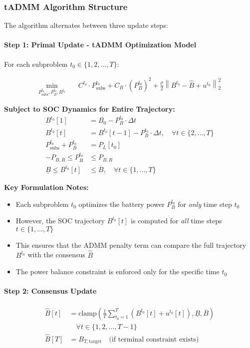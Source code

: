 \subsubsection{tADMM Algorithm Structure}

The algorithm alternates between three update steps:

\paragraph{Step 1: Primal Update - tADMM Optimization Model}
For each subproblem $t_0 \in \{1, 2, \ldots, T\}$:

\begin{align}
\min_{P_{\text{subs}}^{t_0}, P_{B}^{t_0}, B^{t_0}} \quad & C^{t_0} \cdot P_{\text{subs}}^{t_0} + C_B \cdot \left(P_{B}^{t_0}\right)^2 + \frac{\rho}{2} \left\| B^{t_0} - \hat{B} + u^{t_0} \right\|_2^2
\end{align}

\textbf{Subject to SOC Dynamics for Entire Trajectory:}
\begin{align}
B^{t_0}[1] &= B_0 - P_{B}^{t_0} \cdot \Delta t \\
B^{t_0}[t] &= B^{t_0}[t-1] - P_{B}^{t_0} \cdot \Delta t, \quad \forall t \in \{2, \ldots, T\} \\
P_{\text{subs}}^{t_0} + P_{B}^{t_0} &= P_L[t_0] \\
-P_{B,R} \leq P_{B}^{t_0} &\leq P_{B,R} \\
\underline{B} \leq B^{t_0}[t] &\leq \overline{B}, \quad \forall t \in \{1, \ldots, T\}
\end{align}

\textbf{Key Formulation Notes:}
\begin{itemize}
    \item Each subproblem $t_0$ optimizes the battery power $P_{B}^{t_0}$ for \textit{only} time step $t_0$
    \item However, the SOC trajectory $B^{t_0}[t]$ is computed for \textit{all} time steps $t \in \{1, \ldots, T\}$
    \item This ensures that the ADMM penalty term can compare the full trajectory $B^{t_0}$ with the consensus $\hat{B}$
    \item The power balance constraint is enforced only for the specific time $t_0$
\end{itemize}

\paragraph{Step 2: Consensus Update}
\begin{align}
\hat{B}[t] &= \text{clamp}\left( \frac{1}{T} \sum_{t_0=1}^{T} \left( B^{t_0}[t] + u^{t_0}[t] \right), \underline{B}, \overline{B} \right) \\
&\quad \forall t \in \{1, 2, \ldots, T-1\} \\
\hat{B}[T] &= B_{T,\text{target}} \quad \text{(if terminal constraint exists)}
\end{align}


